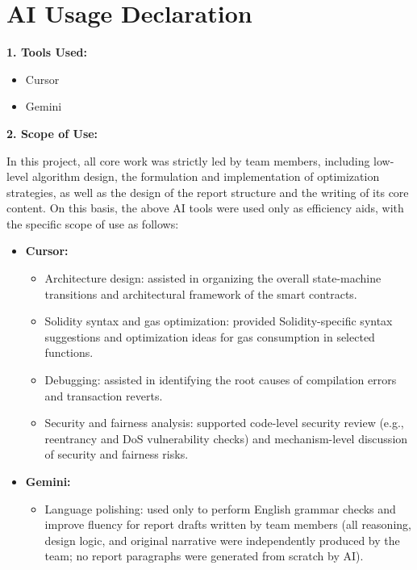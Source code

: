 \documentclass[10pt,a4paper]{article}
\begin{document}
\newpage
\appendix
\section{AI Usage Declaration}

\textbf{1. Tools Used:}
\begin{itemize}
    \item Cursor
    \item Gemini
\end{itemize}

\textbf{2. Scope of Use:}

In this project, all core work was strictly led by team members, including low-level algorithm design, the formulation and implementation of optimization strategies, as well as the design of the report structure and the writing of its core content. On this basis, the above AI tools were used only as efficiency aids, with the specific scope of use as follows:

\begin{itemize}
    \item \textbf{Cursor:}
    \begin{itemize}
        \item Architecture design: assisted in organizing the overall state-machine transitions and architectural framework of the smart contracts.
        \item Solidity syntax and gas optimization: provided Solidity-specific syntax suggestions and optimization ideas for gas consumption in selected functions.
        \item Debugging: assisted in identifying the root causes of compilation errors and transaction reverts.
        \item Security and fairness analysis: supported code-level security review (e.g., reentrancy and DoS vulnerability checks) and mechanism-level discussion of security and fairness risks.
    \end{itemize}
    \item \textbf{Gemini:}
    \begin{itemize}
        \item Language polishing: used only to perform English grammar checks and improve fluency for report drafts written by team members (all reasoning, design logic, and original narrative were independently produced by the team; no report paragraphs were generated from scratch by AI).
    \end{itemize}
\end{itemize}
\end{document}
